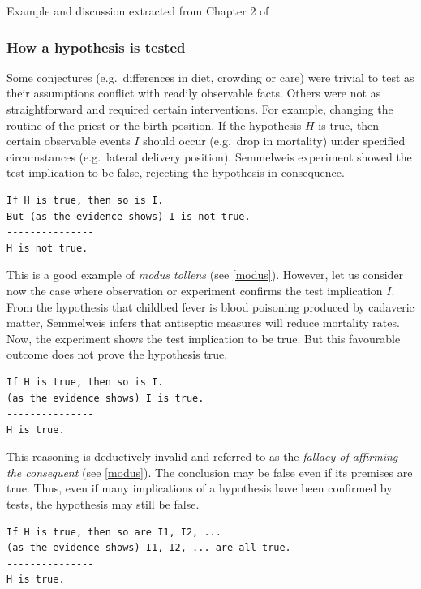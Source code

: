 \documentclass[
]{book}
\newenvironment{rnote}{\par\raggedleft}{\par}
\begin{document}
\begin{rnote}
Example and discussion extracted from Chapter 2 of \citep{hempel-pos}

\end{rnote}

\hypertarget{how-a-hypothesis-is-tested}{%
\subsubsection{How a hypothesis is tested}\label{how-a-hypothesis-is-tested}}

Some conjectures (e.g.~differences in diet, crowding or care) were trivial to test as their assumptions conflict with readily observable facts. Others were not as straightforward and required certain interventions. For example, changing the routine of the priest or the birth position. If the hypothesis \(H\) is true, then certain observable events \(I\) should occur (e.g.~drop in mortality) under specified circumstances (e.g.~lateral delivery position). Semmelweis experiment showed the test implication to be false, rejecting the hypothesis in consequence.

\begin{verbatim}
If H is true, then so is I.
But (as the evidence shows) I is not true.
---------------
H is not true.
\end{verbatim}

This is a good example of \emph{modus tollens} (see \ref{modus}). However, let us consider now the case where observation or experiment confirms the test implication \(I\). From the hypothesis that childbed fever is blood poisoning produced by cadaveric matter, Semmelweis infers that antiseptic measures will reduce mortality rates. Now, the experiment shows the test implication to be true. But this favourable outcome does not prove the hypothesis true.

\begin{verbatim}
If H is true, then so is I.
(as the evidence shows) I is true.
---------------
H is true.
\end{verbatim}

This reasoning is deductively invalid and referred to as the \emph{fallacy of affirming the consequent} (see \ref{modus}). The conclusion may be false even if its premises are true. Thus, even if many implications of a hypothesis have been confirmed by tests, the hypothesis may still be false.

\begin{verbatim}
If H is true, then so are I1, I2, ...
(as the evidence shows) I1, I2, ... are all true.
---------------
H is true.
\end{verbatim}
\end{document}
